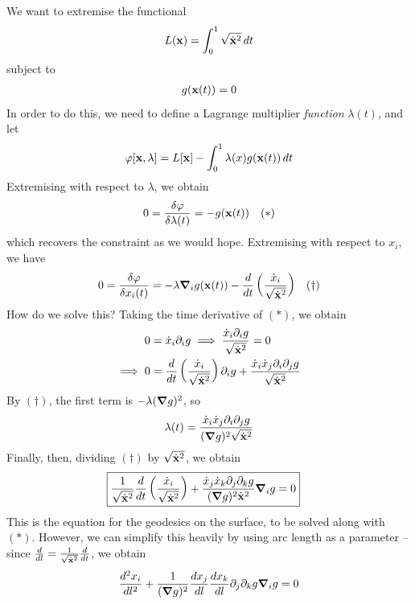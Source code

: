 \documentclass{../../template/note}
\begin{document}
    We want to extremise the functional
    \begin{align*}
        L(\V x) = \int_0^1 \sqrt{\dot{\V x}^2} \D t
    \end{align*}
    subject to
    \begin{align*}
        g(\V x(t)) = 0
    \end{align*}
    In order to do this, we need to define a Lagrange multiplier \emph{function} $\lambda(t)$, and let
    \begin{align*}
        \varphi[\V x, \lambda] = L[\V x] - \int_0^1 \lambda(x) g(\V x(t)) \D t
    \end{align*}
    Extremising with respect to $\lambda$, we obtain
    \begin{align*}
        0 = \frac{\delta \varphi}{\delta \lambda(t)} = -g(\V x(t)) && (*)
    \end{align*}
    which recovers the constraint as we would hope. Extremising with respect to $x_i$, we have
    \begin{align*}
        0 = \frac{\delta \varphi}{\delta x_i(t)} = -\lambda \grad_i g(\V x(t)) - \frac{d}{dt} \left(\frac{\dot x_i}{\sqrt{\dot{\V x}^2}}\right) && (\dagger)
    \end{align*}
    How do we solve this? Taking the time derivative of $(*)$, we obtain
    \begin{align*}
        0 &= \dot x_i \pr_i g \implies \frac{\dot x_i \pr_i g}{\sqrt{\dot{\V x}^2}} = 0 \\
        \implies 0 &= \frac{d}{dt} \left(\frac{\dot x_i}{\sqrt{\dot{\V x}^2}}\right) \pr_i g + \frac{\dot x_i \dot x_j \pr_i \pr_j g}{\sqrt{\dot{\V x}^2}}
    \end{align*}
    By $(\dagger)$, the first term is $-\lambda (\grad g)^2$, so
    \begin{align*}
        \lambda(t) = \frac{\dot x_i \dot x_j \pr_i \pr_j g}{(\grad g)^2 \sqrt{\dot{\V x}^2}}
    \end{align*}
    Finally, then, dividing $(\dagger)$ by $\sqrt{\dot{\V x}^2}$, we obtain
    \begin{align*}
        \Aboxed{\frac{1}{\sqrt{\dot{\V x}^2}} \frac{d}{dt} \left(\frac{\dot x_i}{\sqrt{\dot{\V x}^2}}\right) + \frac{\dot x_j \dot x_k \pr_j \pr_k g}{(\grad g)^2 \dot{\V x}^2}\grad_i g = 0}
    \end{align*}
    This is the equation for the geodesics on the surface, to be solved along with $(*)$. However, we can simplify this heavily by using arc length as a parameter -- since $\frac{d}{dl} = \frac{1}{\sqrt{\dot{\V x}^2}} \frac{d}{dt}$, we obtain
    \begin{align*}
        \frac{d^2x_i}{dl^2} + \frac{1}{(\grad g)^2} \frac{dx_j}{dl} \frac{dx_k}{dl} \pr_j \pr_k g \grad_i g = 0
    \end{align*}
    
\end{document}
